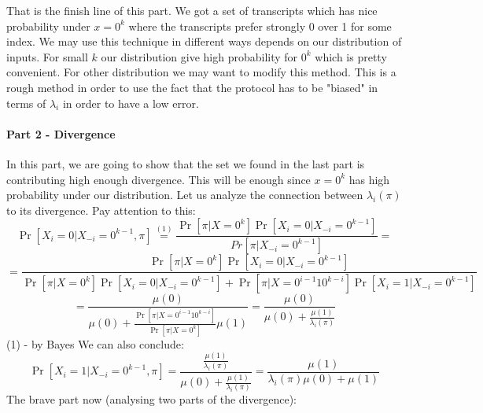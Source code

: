 \documentclass{article}
\theoremstyle{plain}
\begin{document}
That is the finish line of this part. We got a set of transcripts which has nice probability under $x = 0^k$ where the transcripts prefer strongly 0 over 1 for some index. We may use this technique in different ways depends on our distribution of inputs. For small $k$ our distribution give high probability for $0^k$ which is pretty convenient. For other distribution we may want to modify this method. \newline
This is a rough method in order to use the fact that the protocol has to be "biased" in terms of $\lambda_i$ in order to have a low error. \newline
\paragraph{Part 2 - Divergence}
In this part, we are going to show that the set we found in the last part is contributing high enough divergence. This will be enough since $x = 0^k$ has high probability under our distribution. \newline
Let us analyze the connection between $\lambda_i(\pi)$ to its divergence. \newline
Pay attention to this: \newline
\begin{equation*}
    \Pr[X_i = 0 | X_{-i}=0^{k-1}, \pi] \overset{(1)}{=} \frac{\Pr[\pi | X=0^k]\Pr[X_i=0|X_{-i}=0^{k-1}]}{Pr[\pi|X_{-i} = 0^{k-1}]} = 
\end{equation*}
\begin{equation*}
    = \frac{\Pr[\pi | X=0^k]\Pr[X_i=0|X_{-i}=0^{k-1}]}{\Pr[\pi | X=0^k]\Pr[X_i=0|X_{-i}=0^{k-1}] + \Pr[\pi | X=0^{i-1}10^{k-i}]\Pr[X_i=1|X_{-i}=0^{k-1}]}
\end{equation*}
\begin{equation*}
 =  \frac{\mu(0)}{\mu(0) + \frac{\Pr[\pi | X=0^{i-1}10^{k-i}]}{\Pr[\pi | X=0^k]}\mu(1)} = \frac{\mu(0)}{\mu(0) + \frac{\mu(1)}{\lambda_i(\pi)}} 
\end{equation*} 
(1) - by Bayes \newline
We can also conclude: \newline
\begin{equation*}
\Pr[X_i = 1 | X_{-i}=0^{k-1}, \pi]  = \frac{\frac{\mu(1)}{\lambda_i(\pi)}}{\mu(0) + \frac{\mu(1)}{\lambda_i(\pi)}} = \frac{\mu(1)}{\lambda_i(\pi)\mu(0) + \mu(1)}
\end{equation*}
The brave part now (analysing two parts of the divergence): \newline
\end{document}
